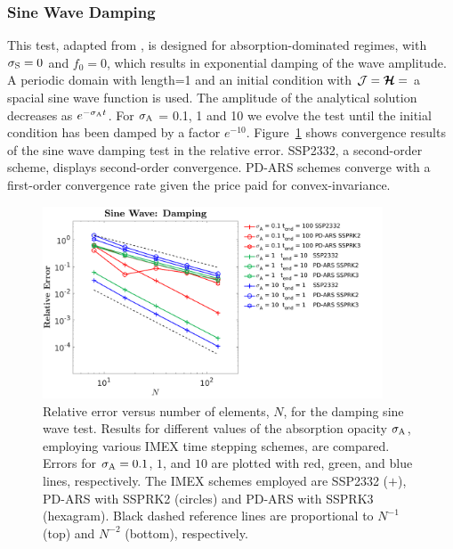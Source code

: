 \subsubsection{Sine Wave Damping}
This test, adapted from \cite{skinnerOstriker_2013}, is designed for absorption-dominated regimes, with $\sigma_{{\rm S}} = 0$ and $f_0 = 0$, which results in exponential damping of the wave amplitude.
A periodic domain with length=1 and an initial condition with $\mathcal{J} = \boldsymbol{\mathcal{H}} =$ a spacial sine wave function is used.
The amplitude of the analytical solution decreases as $e^{-\sigma_{{\rm A}} t}$.
For $\sigma_{{\rm A}}$ = 0.1, 1 and 10 we evolve the test until the initial condition has been damped by a factor $e^{-10}$. 
Figure~\ref{fig:SineWaveDamping} shows convergence results of the sine wave damping test in the relative error.
SSP2332, a second-order scheme, displays second-order convergence.
PD-ARS schemes converge with a first-order convergence rate given the price paid for convex-invariance.
\begin{figure}[h]
  \centering
    \includegraphics[width=0.9\textwidth]{figures/SineWaveDamping}
   \caption{Relative error versus number of elements, $N$, for the damping sine wave test. Results for different values of the absorption opacity $\sigma_{{\rm A}}$, employing various IMEX time stepping schemes, are compared.  Errors for $\sigma_{{\rm A}}=0.1$, $1$, and $10$ are plotted with red, green, and blue lines, respectively.  The IMEX schemes employed are SSP2332 ($+$), PD-ARS with SSPRK2 (circles) and PD-ARS with SSPRK3 (hexagram).  Black dashed reference lines are proportional to $N^{-1}$ (top) and $N^{-2}$ (bottom), respectively.}
  \label{fig:SineWaveDamping}
\end{figure}

